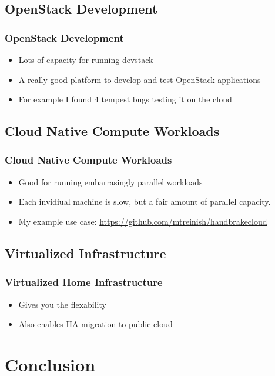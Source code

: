\documentclass[aspectratio=169,11pt,hyperref={colorlinks=true}]{beamer}
\begin{document}
\subsection{OpenStack Development}
\begin{frame}
    \frametitle{OpenStack Development}
    \begin{itemize}
        \item Lots of capacity for running devstack
        \item A really good platform to develop and test OpenStack
              applications
        \item For example I found 4 tempest bugs testing it on the cloud
    \end{itemize}
\end{frame}

\subsection{Cloud Native Compute Workloads}
\begin{frame}
        \frametitle{Cloud Native Compute Workloads}
        \begin{itemize}
        \item Good for running embarrasingly parallel workloads
        \item Each invidiual machine is slow, but a fair amount of
            parallel capacity.
        \item My example use case: \href{https://github.com/mtreinish/handbrakecloud}{https://github.com/mtreinish/handbrakecloud}
    \end{itemize}
\end{frame}

\subsection{Virtualized Infrastructure}
\begin{frame}
    \frametitle{Virtualized Home Infrastructure}
    \begin{itemize}
        \item Gives you the flexability
        \item Also enables HA migration to public cloud
    \end{itemize}
\end{frame}


\section{Conclusion}
\end{document}
